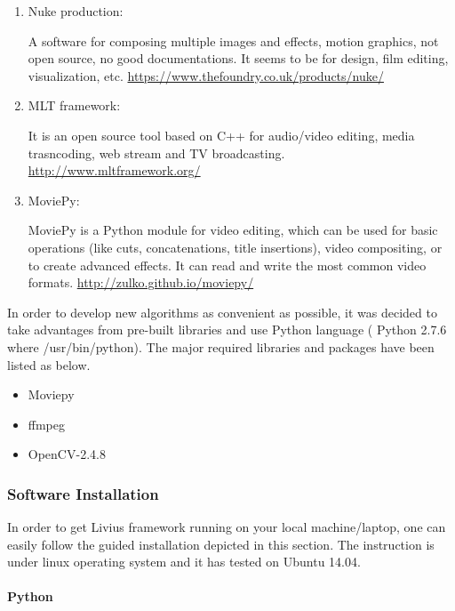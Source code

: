 \documentclass[[12pt,DIV14,BCOR12mm,a4paper,footexclude,headinclude,halfparskip-,twoside,openright,cleardoubleempty,idxtotoc,bibtotoc]{article}
\begin{document}
\begin{enumerate}
\item Nuke production:

A software for composing multiple images and effects, motion graphics, not open source, no good documentations. It seems to be for design, film editing, visualization, etc. \url{https://www.thefoundry.co.uk/products/nuke/}

\item MLT framework:

It is an open source tool based on C++ for audio/video editing, media trasncoding, web stream and TV broadcasting. \url{http://www.mltframework.org/}


\item MoviePy:

MoviePy is a Python module for video editing, which can be used for basic operations (like cuts, concatenations, title insertions), video compositing, or to create advanced effects. It can read and write the most common video formats. \url{http://zulko.github.io/moviepy/}

\end{enumerate}

In order to develop new algorithms as convenient as possible, it was decided to take advantages from pre-built libraries and use Python language ( Python 2.7.6 where /usr/bin/python). The major required libraries and packages have been listed as below.



\begin{itemize}
	\item Moviepy
	\item ffmpeg
	\item OpenCV-2.4.8	
\end{itemize}



\subsubsection{Software Installation}

In order to get Livius framework running  on your local machine/laptop, one can easily follow the guided installation depicted in this section. The instruction is under linux operating system and it has tested on Ubuntu 14.04.

\paragraph{Python}
\end{document}

